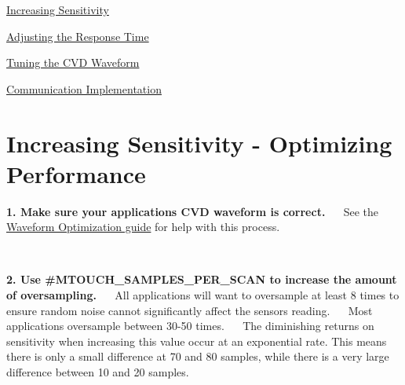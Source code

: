 \begin{DoxyItemize}
\item \hyperlink{ts-Sensitivity}{Increasing Sensitivity} \item \hyperlink{ts-ResponseTime}{Adjusting the Response Time} \item \hyperlink{ts-Waveform}{Tuning the C\+V\+D Waveform} \item \hyperlink{digCom}{Communication Implementation} \end{DoxyItemize}
\hypertarget{ts-Sensitivity}{}\section{Increasing Sensitivity -\/ Optimizing Performance}\label{ts-Sensitivity}
\begin{DoxyItemize}
\item {\bfseries 1. Make sure your application\textquotesingle{}s C\+V\+D waveform is correct.}~\newline
~\newline
 See the \hyperlink{ts-Waveform}{Waveform Optimization guide} for help with this process.\end{DoxyItemize}
~\newline


\begin{DoxyItemize}
\item {\bfseries 2. Use \#\+M\+T\+O\+U\+C\+H\+\_\+\+S\+A\+M\+P\+L\+E\+S\+\_\+\+P\+E\+R\+\_\+\+S\+C\+A\+N to increase the amount of oversampling.}~\newline
~\newline
 All applications will want to oversample at least 8 times to ensure random noise cannot significantly affect the sensor\textquotesingle{}s reading.~\newline
 ~\newline
 Most applications oversample between 30-\/50 times.~\newline
 ~\newline
 The diminishing returns on sensitivity when increasing this value occur at an exponential rate. This means there is only a small difference at 70 and 80 samples, while there is a very large difference between 10 and 20 samples.\end{DoxyItemize}
~\newline


